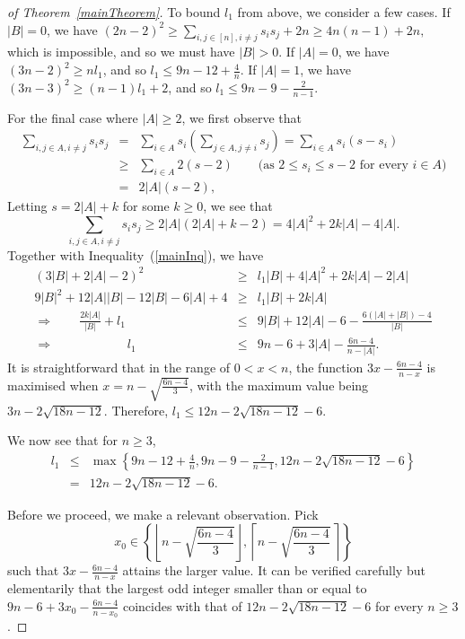\documentclass[
final
]{dmtcs-episciences}
\theoremstyle{definition}
\theoremstyle{remark}
\begin{document}
\begin{proof}[of Theorem~\ref{mainTheorem}]
	To bound $l_1$ from above, we consider a few cases. If $|B|=0$, we have \begin{math}(2n-2)^2 \ge \sum_{i,j\in [n], i\ne j} s_is_j + 2n \ge 4n(n-1) + 2n,\end{math} which is impossible, and so we must have $|B|>0$.
	If $|A| = 0$, we have $(3n-2)^2 \ge nl_1$, and so $l_1 \le 9n - 12 + \frac{4}{n}$.
	If $|A| = 1$, we have $(3n-3)^2 \ge (n-1)l_1 + 2$, and so $l_1 \le 9n - 9 - \frac{2}{n-1}$.
	
	For the final case where $|A|\ge 2$, we first observe that
	\begin{eqnarray*}
	\sum_{i,j\in A, i \ne j} s_is_j &= & \sum_{i\in A}s_i\left(\sum_{j\in A, j\ne i} s_j\right)
	= \sum_{i\in A} s_i (s-s_i)   \\
	&\ge & \sum_{i\in A} 2(s-2) \qquad\mbox{(as $2\le s_i\le s-2$ for every $i\in A$)}  \\
	&= &2|A|(s-2),
	\end{eqnarray*}
	Letting $s = 2|A| + k$ for some $k\ge 0$, we see that
	\begin{displaymath}
\sum_{i,j\in A, i \ne j} s_is_j\ge 2|A|(2|A| + k -2) = 4|A|^2+2k|A| - 4|A|.
\end{displaymath}
	Together with Inequality~(\ref{mainInq}), we have
	\begin{eqnarray*}
	(3|B|+2|A|-2)^2 &\ge & l_1|B| + 4|A|^2+2k|A| - 2|A|\\
	9|B|^2 + 12|A||B| - 12|B| - 6|A| + 4 &\ge & l_1|B| + 2k|A|\\
	\Longrightarrow\qquad \frac{2k|A|}{|B|} + l_1 &\le & 9|B|+12|A| - 6 - \frac{6(|A|+|B|) - 4}{|B|}\\
	\Longrightarrow\qquad \qquad \;\;\;\quad l_1 &\le &  9n -6 +3|A| - \frac{6n-4}{n-|A|}.
	\end{eqnarray*}
	It is straightforward that in the range of $0<x<n$, the function $3x - \frac{6n-4}{n-x}$ is maximised when $x = n - \sqrt{\frac{6n-4}{3}}$, with the maximum value being $3n - 2\sqrt{18n-12}$. Therefore, $l_1\le 12n - 2\sqrt{18n - 12} - 6$.
	
	We now see that for $n\ge 3$,
	\begin{eqnarray*}
	l_1 &\le & \max \left\{9n-12+\frac{4}{n}, 9n-9-\frac{2}{n-1},  12n - 2\sqrt{18n - 12} - 6\right\}  \\
&	= &12n - 2\sqrt{18n - 12} - 6.
	\end{eqnarray*}
	
	Before we proceed, we make a relevant observation. Pick 
	\begin{displaymath}	
	x_0\in \left\{\left\lfloor n-\sqrt{\frac{6n-4}{3}}\right\rfloor, \left\lceil n -\sqrt{\frac{6n-4}{3}}\,\right\rceil\right\}
	\end{displaymath}
	such that $3x - \frac{6n-4}{n-x}$ attains the larger value. 	It can be verified carefully but elementarily that the largest odd integer smaller than or equal to $9n -6 +3x_0 - \frac{6n-4}{n-x_0}$ coincides with that of $12n - 2\sqrt{18n - 12} - 6$ for every $n\geq 3$. 


\end{proof}
\end{document}
